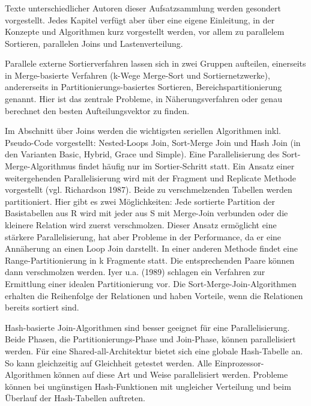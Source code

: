 \documentclass[a4paper,12pt,twoside]{article}
\begin{document}
\subsubsection*{}

Texte unterschiedlicher Autoren dieser Aufsatzsammlung werden gesondert vorgestellt. Jedes Kapitel verfügt aber über eine eigene Einleitung, in der Konzepte und Algorithmen kurz vorgestellt werden, vor allem zu parallelem Sortieren, parallelen Joins und Lastenverteilung.

Parallele externe Sortierverfahren lassen sich in zwei Gruppen aufteilen, einerseits in Merge-basierte Verfahren (k-Wege Merge-Sort und Sortiernetzwerke), anderer\-seits in Parti\-tionierungs-basiertes Sortieren, Bereichs\-partitionierung genannt. Hier ist das zentrale Probleme, in Näherungs\-verfahren oder genau berechnet den besten Aufteilungsvektor zu finden.

Im Abschnitt über Joins werden die wichtigsten seriellen Algorithmen inkl. Pseudo-Code vorgestellt: Nested-Loops Join, Sort-Merge Join und Hash Join (in den Varianten Basic, Hybrid, Grace und Simple). Eine Parallelisierung des Sort-Merge-Algorithmus findet häufig nur im Sortier-Schritt statt. Ein Ansatz einer weitergehenden Parallelisierung wird mit der Fragment und Replicate Methode vorgestellt (vgl. Richardson 1987). Beide zu verschmelzenden Tabellen werden partitioniert. Hier gibt es zwei Möglichkeiten: Jede sortierte Partition der Basistabellen aus R wird mit jeder aus S mit Merge-Join verbunden oder die kleinere Relation wird zuerst verschmolzen. Dieser Ansatz ermöglicht eine stärkere Parallelisierung, hat aber Probleme in der Performance, da er eine Annäherung an einen Loop Join darstellt. In einer anderen Methode findet eine Range-Partitionierung in k Fragmente statt. Die entsprechenden Paare können dann verschmolzen werden. Iyer u.a. (1989) schlagen ein Verfahren zur Ermittlung einer idealen Partitionierung vor. Die Sort-Merge-Join-Algorithmen erhalten die Reihenfolge der Relationen und haben Vorteile, wenn die Relationen bereits sortiert sind.

Hash-basierte Join-Algorithmen sind besser geeignet für eine Parallelisierung. Beide Phasen, die Partitionierungs-Phase und Join-Phase, können parallelisiert werden. Für eine Shared-all-Architektur bietet sich eine globale Hash-Tabelle an. So kann gleichzeitig auf Gleichheit getestet werden. Alle Einprozessor-Algorithmen können auf diese Art und Weise parallelisiert werden. Probleme können bei ungünstigen Hash-Funktionen mit ungleicher Verteilung und beim Überlauf der Hash-Tabellen auftreten.
\end{document}
